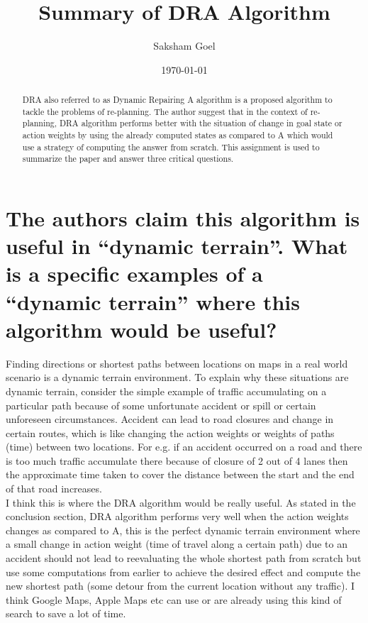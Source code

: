 \documentclass[a4paper]{article}
\title{Summary of DRA\text{*} Algorithm}
\author{Saksham Goel}
\date{\today}
\begin{document}
\maketitle

\begin{abstract}
DRA\text{*} also referred to as Dynamic Repairing A\text{*} algorithm is a proposed algorithm to tackle the problems of re-planning. The author suggest that in the context of re-planning, DRA\text{*} algorithm performs better with the situation of change in goal state or action weights by using the already computed states as compared to A\text{*} which would use a strategy of computing the answer from scratch. This assignment is used to summarize the paper and answer three critical questions.
\end{abstract}

\section{The authors claim this algorithm is useful in “dynamic terrain”. What is a specific examples of a “dynamic terrain” where this algorithm would be useful?}
\label{sec:Q1}

Finding directions or shortest paths between locations on maps in a real world scenario is a dynamic terrain environment. To explain why these situations are dynamic terrain, consider the simple example of traffic accumulating on a particular path because of some unfortunate accident or spill or certain unforeseen circumstances. Accident can lead to road closures and change in certain routes, which is like changing the action weights or weights of paths (time) between two locations. For e.g. if an accident occurred on a road and there is too much traffic accumulate there because of closure of 2 out of 4 lanes then the approximate time taken to cover the distance between the start and the end of that road increases.
\\

I think this is where the DRA\text{*} algorithm would be really useful. As stated in the conclusion section, DRA\text{*} algorithm performs very well when the action weights changes as compared to A\text{*}, this is the perfect dynamic terrain environment where a small change in action weight (time of travel along a certain path) due to an accident should not lead to reevaluating the whole shortest path from scratch but use some computations from earlier to achieve the desired effect and compute the new shortest path (some detour from the current location without any traffic). I think Google Maps, Apple Maps etc can use or are already using this kind of search to save a lot of time.
\\
\end{document}
